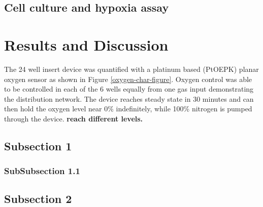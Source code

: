 \subsection*{Cell culture and hypoxia assay}

\section*{Results and Discussion}


The 24 well insert device was quantified with a platinum based (PtOEPK) planar oxygen sensor as shown in Figure \ref{oxygen-char-figure}.
Oxygen control was able to be controlled in each of the 6 wells equally from one gas input demonstrating the distribution network.
The device reaches steady state in 30 minutes and can then hold the oxygen level near 0\% indefinitely, while 100\% nitrogen is pumped through the device. 
\bf{reach different levels.}

\subsection*{Subsection 1}

\subsubsection*{SubSubsection 1.1}

\subsection*{Subsection 2}


